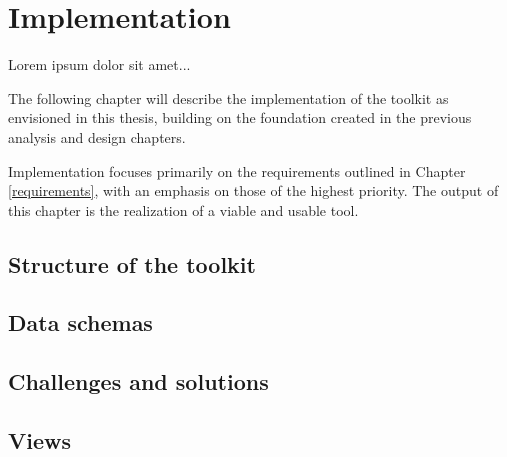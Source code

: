 \chapter{Implementation}

\begin{chapterabstract}
Lorem ipsum dolor sit amet...
\end{chapterabstract}

The following chapter will describe the implementation of the toolkit as envisioned in this thesis, building on the foundation created in the previous analysis and design chapters. 

Implementation focuses primarily on the requirements outlined in Chapter \ref{requirements}, with an emphasis on those of the highest priority. The output of this chapter is the realization of a viable and usable tool.

\section{Structure of the toolkit}

\section{Data schemas}

\section{Challenges and solutions}

\section{Views}